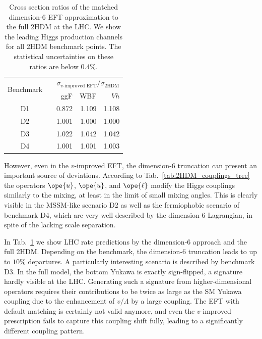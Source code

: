 \begin{table}[b!]  \renewcommand{\arraystretch}{1.2} \centering
    \begin{tabular}{c c rrr} \toprule \multirow{2}{*}{Benchmark}
&\hspace*{1em}& \multicolumn{3}{c}{$\sigma_\text{$v$-improved EFT} /
\sigma_\text{2HDM}$} \\ \cmidrule{3-5} && ggF & WBF & $Vh$ \\ \midrule
D1 && 0.872 & 1.109 & 1.108 \\ D2 && 1.001 & 1.000 & 1.000 \\ D3 &&
1.022 & 1.042 & 1.042 \\ D4 && 1.001 & 1.001 & 1.003\\ \bottomrule
    \end{tabular}
  \caption{Cross section ratios of the matched dimension-6 EFT
approximation to the full 2HDM at the LHC. We show the leading Higgs
production channels for all 2HDM benchmark points.  The statistical
uncertainties on these ratios are below 0.4\%.}
  \label{tab:2HDM_rates}
\end{table}

However, even in the $v$-improved EFT, the dimension-6 truncation can
present an important source of deviations. According to
Tab.~\ref{tab:2HDM_couplings_tree} the operators $\ope{u}$, $\ope{u}$,
and $\ope{\ell}$ modify the Higgs couplings similarly to the mixing,
at least in the limit of small mixing angles. This is clearly visible
\eg in the MSSM-like scenario D2 as well as the fermiophobic scenario
of benchmark D4, which are very well described by the dimension-6
Lagrangian, in spite of the lacking scale separation.

In Tab.~\ref{tab:2HDM_rates} we show LHC rate predictions by the
dimension-6 approach and the full 2HDM.  Depending on the benchmark,
the dimension-6 truncation leads to up to $10 \%$ departures.  A
particularly interesting scenario is described by benchmark D3. In the
full model, the bottom Yukawa is exactly sign-flipped, a signature
hardly visible at the LHC.  Generating such a signature from
higher-dimensional operators requires their contributions to be twice
as large as the SM Yukawa coupling due to the enhancement of
$v/\Lambda$ by a large coupling.  The EFT with default matching is
certainly not valid anymore, and even the $v$-improved prescription
fails to capture this coupling shift fully, leading to a significantly
different coupling pattern.  \medskip

